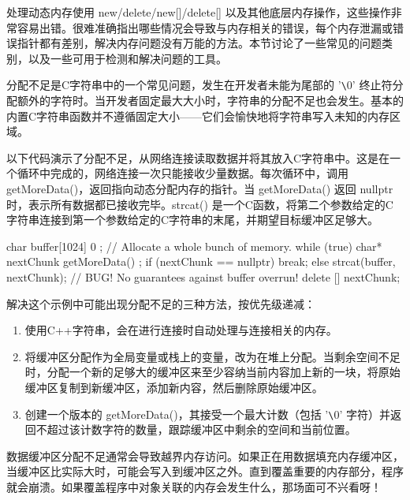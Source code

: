 
处理动态内存使用 new/delete/new[]/delete[] 以及其他底层内存操作，这些操作非常容易出错。很难准确指出哪些情况会导致与内存相关的错误，每个内存泄漏或错误指针都有差别，解决内存问题没有万能的方法。本节讨论了一些常见的问题类别，以及一些可用于检测和解决问题的工具。


分配不足是C字符串中的一个常见问题，发生在开发者未能为尾部的 '\verb|\|0' 终止符分配额外的字符时。当开发者固定最大大小时，字符串的分配不足也会发生。基本的内置C字符串函数并不遵循固定大小——它们会愉快地将字符串写入未知的内存区域。

以下代码演示了分配不足，从网络连接读取数据并将其放入C字符串中。这是在一个循环中完成的，网络连接一次只能接收少量数据。每次循环中，调用 getMoreData()，返回指向动态分配内存的指针。当 getMoreData() 返回 nullptr 时，表示所有数据都已接收完毕。strcat() 是一个C函数，将第二个参数给定的C字符串连接到第一个参数给定的C字符串的末尾，并期望目标缓冲区足够大。

\begin{cpp}
char buffer[1024] { 0 }; // Allocate a whole bunch of memory.
while (true) {
    char* nextChunk { getMoreData() };
    if (nextChunk == nullptr) {
        break;
    } else {
        strcat(buffer, nextChunk); // BUG! No guarantees against buffer overrun!
        delete [] nextChunk;
    }
}
\end{cpp}

解决这个示例中可能出现分配不足的三种方法，按优先级递减：

\begin{enumerate}
\item
使用C++字符串，会在进行连接时自动处理与连接相关的内存。

\item
将缓冲区分配作为全局变量或栈上的变量，改为在堆上分配。当剩余空间不足时，分配一个新的足够大的缓冲区来至少容纳当前内容加上新的一块，将原始缓冲区复制到新缓冲区，添加新内容，然后删除原始缓冲区。

\item
创建一个版本的 getMoreData()，其接受一个最大计数（包括 '\verb|\|0' 字符）并返回不超过该计数字符的数量，跟踪缓冲区中剩余的空间和当前位置。
\end{enumerate}

数据缓冲区分配不足通常会导致越界内存访问。如果正在用数据填充内存缓冲区，当缓冲区比实际大时，可能会写入到缓冲区之外。直到覆盖重要的内存部分，程序就会崩溃。如果覆盖程序中对象关联的内存会发生什么，那场面可不兴看呀！

